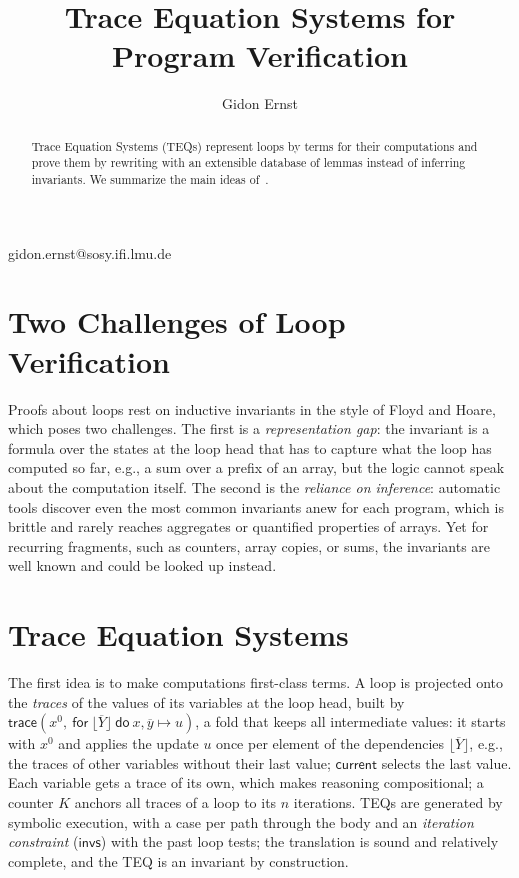 \documentclass[english]{lni}
\newcommand{\code}[1]{\mathsf{#1}}
\newcommand{\butlast}[1]{\lfloor #1 \rfloor}
\newcommand{\TRACE}[4]{\code{trace}(#1,\ \code{for}\ #2\ \code{do}\ #3 \mapsto #4)}
\begin{document}
\title[Trace Equation Systems]{Trace Equation Systems for Program Verification}
\author[1]{Gidon Ernst}{gidon.ernst@sosy.ifi.lmu.de}{}
\maketitle

\begin{abstract}
Trace Equation Systems (TEQs) represent loops by terms for their computations and prove them by rewriting with an
extensible database of lemmas instead of inferring invariants. We summarize the main ideas of~\cite{teq}.
\end{abstract}


\section{Two Challenges of Loop Verification}

Proofs about loops rest on inductive invariants in the style of Floyd and Hoare, which poses two challenges. The
first is a \emph{representation gap}: the invariant is a formula over the states at the loop head that has to capture
what the loop has computed so far, e.g., a sum over a prefix of an array, but the logic cannot speak about the
computation itself. The second is the \emph{reliance on inference}: automatic tools discover even the most common
invariants anew for each program, which is brittle and rarely reaches aggregates or quantified properties of arrays.
Yet for recurring fragments, such as counters, array copies, or sums, the invariants are well known and could be
looked up instead.

\section{Trace Equation Systems}

The first idea is to make computations first-class terms. A loop is projected onto the \emph{traces} of the values of
its variables at the loop head, built by $\TRACE{x^0}{\butlast{\overline{Y}}}{x, \overline{y}}{u}$, a fold that keeps
all intermediate values: it starts with $x^0$ and applies the update $u$ once per element of the dependencies
$\butlast{\overline{Y}}$, e.g., the traces of other variables without their last value; $\code{current}$ selects the
last value. Each variable gets a trace of its own, which makes reasoning compositional; a counter $K$ anchors all
traces of a loop to its $n$ iterations. TEQs are generated by symbolic execution, with a case per path through the
body and an \emph{iteration constraint} ($\code{invs}$) with the past loop tests; the translation is sound and
relatively complete, and the TEQ is an invariant by construction.
\end{document}
